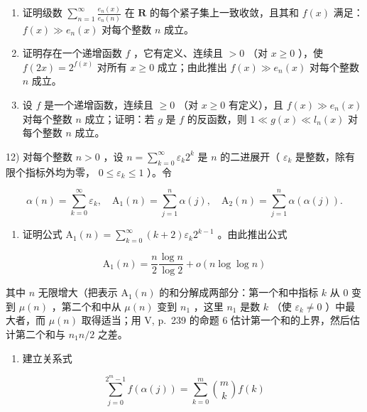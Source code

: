 \begin{enumerate}
\def\labelenumi{\arabic{enumi})}
\setcounter{enumi}{8}
\item
  证明级数 \(\sum_{n=1}^{\infty} \frac{e_n(x)}{e_n(n)}\) 在 \(\mathbf{R}\) 的每个紧子集上一致收敛，且其和 \(f(x)\) 满足： \(f(x) \gg e_n(x)\) 对每个整数 \(n\) 成立。
\item
  证明存在一个递增函数 \(f\) ，它有定义、连续且 \(> 0\) （对 \(x \geqslant 0\) ），使 \(f(2x) = 2^{f(x)}\) 对所有 \(x \geqslant 0\) 成立；由此推出 \(f(x) \gg e_n(x)\) 对每个整数 \(n\) 成立。
\item
  设 \(f\) 是一个递增函数，连续且 \(\geqslant 0\) （对 \(x \geqslant 0\) 有定义），且 \(f(x) \gg e_n(x)\) 对每个整数 \(n\) 成立；证明：若 \(g\) 是 \(f\) 的反函数，则 \(1 \ll g(x) \ll l_n(x)\) 对每个整数 \(n\) 成立。
\end{enumerate}

12) 对每个整数 \(n > 0\) ，设 \(n = \sum_{k=0}^{\infty} \varepsilon_k 2^k\) 是 \(n\) 的二进展开（ \(\varepsilon_k\) 是整数，除有限个指标外均为零， \(0 \leqslant \varepsilon_k \leqslant 1\) ）。令

\[
\alpha (n) = \sum_ {k = 0} ^ {\infty} \varepsilon_ {k}, \quad \mathrm{A} _ {1} (n) = \sum_ {j = 1} ^ {n} \alpha (j), \quad \mathrm{A} _ {2} (n) = \sum_ {j = 1} ^ {n} \alpha (\alpha (j)).
\]

\begin{enumerate}
\def\labelenumi{\alph{enumi})}
\tightlist
\item
  证明公式 \(\mathrm{A}_1(n) = \sum_{k=0}^{\infty}(k+2)\varepsilon_k 2^{k-1}\) 。由此推出公式
\end{enumerate}

\[
\mathrm{A} _ {1} (n) = \frac {n}{2} \frac {\log n}{\log 2} + o (n \log \log n)
\]

其中 \(n\) 无限增大（把表示 \(\mathrm{A}_1(n)\) 的和分解成两部分：第一个和中指标 \(k\) 从 0 变到 \(\mu(n)\) ，第二个和中从 \(\mu(n)\) 变到 \(n_1\) ，这里 \(n_1\) 是数 \(k\) （使 \(\varepsilon_k \neq 0\) ）中最大者，而 \(\mu(n)\) 取得适当；用 V, p.~239 的命题 6 估计第一个和的上界，然后估计第二个和与 \(n_1n / 2\) 之差。

\begin{enumerate}
\def\labelenumi{\alph{enumi})}
\setcounter{enumi}{1}
\tightlist
\item
  建立关系式
\end{enumerate}

\[
\sum_ {j = 0} ^ {2 ^ {m} - 1} f (\alpha (j)) = \sum_ {k = 0} ^ {m} \binom {m} {k} f (k)
\]

